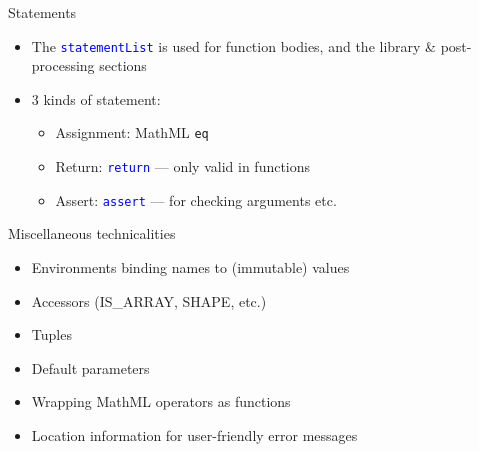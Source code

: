\documentclass[t,xcolor={usenames,dvipsnames}]{beamer}
\newcommand{\csym}[1]{\textcolor{Blue}{\texttt{#1}}}
\begin{document}
\begin{frame}{Statements}
\begin{itemize}
\item The \csym{statementList} is used for function bodies, and the library \& post-processing sections
\item 3 kinds of statement:
  \begin{itemize}
  \item Assignment: MathML \texttt{eq}
  \item Return: \csym{return} --- only valid in functions
  \item Assert: \csym{assert} --- for checking arguments etc.
  \end{itemize}
\end{itemize}
\end{frame}

\begin{frame}{Miscellaneous technicalities}
\begin{itemize}
\item Environments binding names to (immutable) values
\item Accessors (IS\_ARRAY, SHAPE, etc.)
\item Tuples
\item Default parameters
\item Wrapping MathML operators as functions
\item Location information for user-friendly error messages
\end{itemize}
\end{frame}
\end{document}
